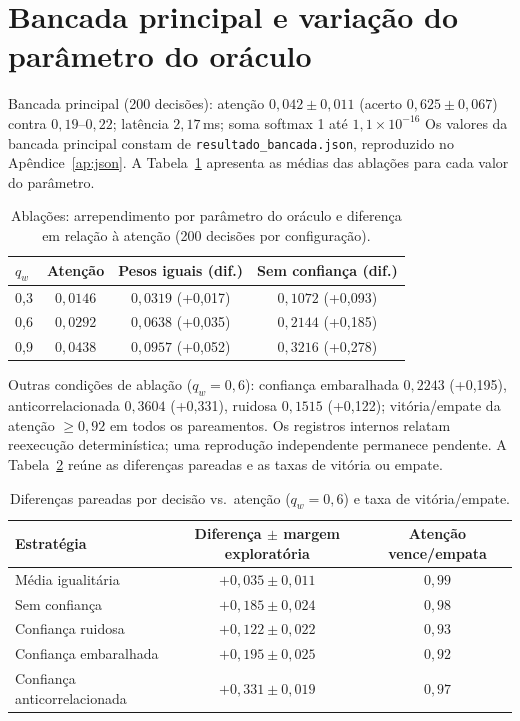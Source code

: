 \documentclass[12pt,openany,oneside,a4paper,brazil,chapter=TITLE]{abntex2}
\begin{document}
\section{Bancada principal e variação do parâmetro do oráculo}
Bancada principal (200 decisões): atenção $0{,}042\pm0{,}011$ (acerto $0{,}625\pm0{,}067$) contra $0{,}19$--$0{,}22$; latência $2{,}17$\,ms; soma softmax 1 até $1{,}1\times10^{-16}$ Os valores da bancada principal constam de \nolinkurl{resultado_bancada.json}, reproduzido no Apêndice~\ref{ap:json}.
A Tabela~\ref{tab:bench} apresenta as médias das ablações para cada valor do parâmetro.
\begin{table}[htbp]
\fontsize{10}{12}\selectfont\SingleSpacing
\centering
\caption{Ablações: arrependimento por parâmetro do oráculo e diferença em relação à atenção (200 decisões por configuração).}
\label{tab:bench}
\begin{tabular}{lccc}
\toprule
$q_w$ & Atenção & Pesos iguais (dif.) & Sem confiança (dif.) \\
\midrule
0,3 & $0{,}0146$ & $0{,}0319$ (+0,017) & $0{,}1072$ (+0,093) \\
0,6 & $0{,}0292$ & $0{,}0638$ (+0,035) & $0{,}2144$ (+0,185) \\
0,9 & $0{,}0438$ & $0{,}0957$ (+0,052) & $0{,}3216$ (+0,278) \\
\bottomrule
\end{tabular}
\end{table}
Outras condições de ablação ($q_w=0{,}6$): confiança embaralhada $0{,}2243$ (+0,195), anticorrelacionada $0{,}3604$ (+0,331), ruidosa $0{,}1515$ (+0,122); vitória/empate da atenção $\geq 0{,}92$ em todos os pareamentos. Os registros internos relatam reexecução determinística; uma reprodução independente permanece pendente. A Tabela~\ref{tab:pareado} reúne as diferenças pareadas e as taxas de vitória ou empate.
\begin{table}[htbp]
\fontsize{10}{12}\selectfont\SingleSpacing
\centering
\caption{Diferenças pareadas por decisão vs.\ atenção ($q_w=0{,}6$) e taxa de vitória/empate.}
\label{tab:pareado}
\begin{tabular}{lcc}
\toprule
Estratégia & Diferença $\pm$ margem exploratória & Atenção vence/empata \\
\midrule
Média igualitária & $+0{,}035\pm0{,}011$ & $0{,}99$ \\
Sem confiança & $+0{,}185\pm0{,}024$ & $0{,}98$ \\
Confiança ruidosa & $+0{,}122\pm0{,}022$ & $0{,}93$ \\
Confiança embaralhada & $+0{,}195\pm0{,}025$ & $0{,}92$ \\
Confiança anticorrelacionada & $+0{,}331\pm0{,}019$ & $0{,}97$ \\
\bottomrule
\end{tabular}
\end{table}
\end{document}
